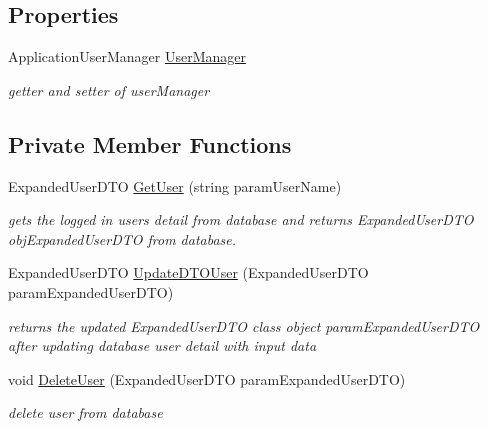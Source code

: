 \subsection*{Properties}
\begin{DoxyCompactItemize}
\item 
Application\+User\+Manager \hyperlink{class_alfa_accounting_1_1_controllers_1_1_user_controller_a88b94fb079c158860b583be20660201f}{User\+Manager}
\begin{DoxyCompactList}\small\item\em getter and setter of user\+Manager \end{DoxyCompactList}\end{DoxyCompactItemize}
\subsection*{Private Member Functions}
\begin{DoxyCompactItemize}
\item 
Expanded\+User\+D\+TO \hyperlink{class_alfa_accounting_1_1_controllers_1_1_user_controller_a3e89b06788cf166c1955b02f5f3673c3}{Get\+User} (string param\+User\+Name)
\begin{DoxyCompactList}\small\item\em gets the logged in user\textquotesingle{}s detail from database and returns Expanded\+User\+D\+TO obj\+Expanded\+User\+D\+TO from database. \end{DoxyCompactList}\item 
Expanded\+User\+D\+TO \hyperlink{class_alfa_accounting_1_1_controllers_1_1_user_controller_a6d78b5992e6e0fc55c95b8a0e3abb312}{Update\+D\+T\+O\+User} (Expanded\+User\+D\+TO param\+Expanded\+User\+D\+TO)
\begin{DoxyCompactList}\small\item\em returns the updated Expanded\+User\+D\+TO class object param\+Expanded\+User\+D\+TO after updating database user detail with input data \end{DoxyCompactList}\item 
void \hyperlink{class_alfa_accounting_1_1_controllers_1_1_user_controller_a5beae5b7c0ee86dd2833f3fcaabd8455}{Delete\+User} (Expanded\+User\+D\+TO param\+Expanded\+User\+D\+TO)
\begin{DoxyCompactList}\small\item\em delete user from database \end{DoxyCompactList}\end{DoxyCompactItemize}
